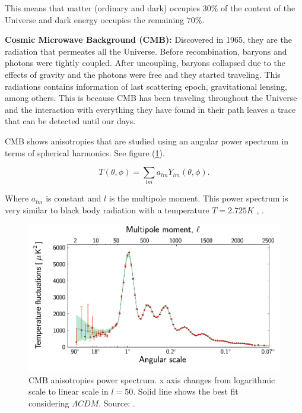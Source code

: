 \documentclass[onecolumn,           %
               showpacs,            %
               preprintnumbers,     %
               aps,                 %
               prl,          	    %
               letterpaper,             %
               superscriptaddress,      %
               nofootinbib,         %
               tightenlines,        %
               floats,floatfix      %
               ,usenatbib,
               ]{revtex4-1}
\begin{document}
This means that matter (ordinary and dark) occupies $30 \%$ of the content of the Universe and dark energy occupies the remaining $70 \%$. 

\textbf{Cosmic Microwave Background (CMB):} Discovered in 1965, they are the radiation that permeates all the Universe. Before recombination, baryons and photons were tightly coupled. After uncoupling, baryons collapsed due to the effects of gravity and the photons were free and they started traveling. This radiations contains information of last scattering epoch, gravitational lensing, among others. This is because CMB has been traveling throughout the Universe and the interaction with everything they have found in their path leaves a trace that can be detected until our days.

CMB shows anisotropies that are studied using an angular power spectrum in terms of spherical harmonics. See figure (\ref{CMBgraf}).

\begin{equation}
T(\theta, \phi) = \sum_{lm} a_{lm} Y_{lm} \left(\theta, \phi \right) .
\end{equation}

Where $a_{lm}$ is constant and $l$ is the multipole moment. This power spectrum is very similar to black body radiation with a temperature $T = 2.725K$ \cite{CMB1}, \cite{CMB2}.

\begin{figure}[h]
	\centering
	\includegraphics[width=12cm]{FiguresCosmo/espectro_temperatura_CMB.png}	
	\caption{CMB anisotropies power spectrum. x axis changes from logarithmic scale to linear scale in $l = 50$. Solid line shows the best fit considering $\Lambda CDM$. Source: \cite{parametros}.}
	\label{CMBgraf} 
\end{figure}
\end{document}
